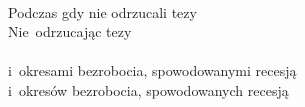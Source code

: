 \documentclass[a4paper,11pt]{article}
\begin{document}
\begin{center}

\end{center}
\noi
{} \\
\Jest Podczas gdy nie odrzucali tezy \\
\Powin  Nie~odrzucając tezy \\
 \\
\Jest i~okresami bezrobocia, spowodowanymi recesją \\
\Powin  i~okresów bezrobocia, spowodowanych recesją \\
\end{document}
